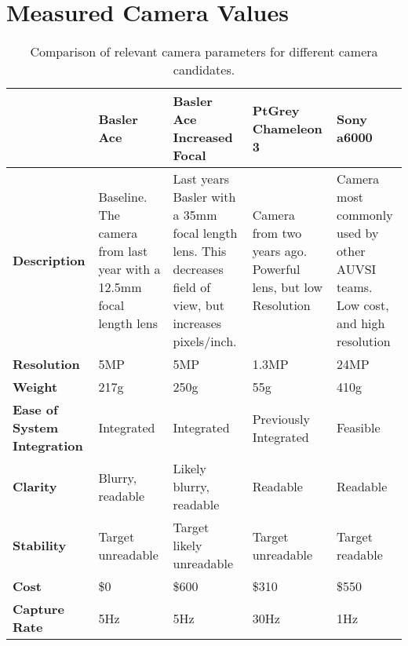 \documentclass[]{auvsi_doc}
\begin{document}
\section{Measured Camera Values}
\begin{table}[H]
	\centering
	\caption{Comparison of relevant camera parameters for different camera candidates.}
	\begin{tabular}{|p{2.5cm}|p{2.9cm}|p{2.9cm}|p{2.9cm}|p{2.9cm}|}
	\hline
	\rowcolor[HTML]{C0C0C0}
& {\color[HTML]{000000} \textbf{Basler Ace}} & {\color[HTML]{000000} \textbf{Basler Ace Increased Focal}} & {\color[HTML]{000000} \textbf{PtGrey Chameleon 3}} & {\color[HTML]{000000} \textbf{Sony a6000}}\\ \hline
{\color[HTML]{000000} \textbf{Description}}	&	Baseline. The camera from last year with a 12.5mm focal length lens	&	Last years Basler with a 35mm focal length lens. This decreases field of view, but increases pixels/inch. &	Camera from two years ago. Powerful lens, but low Resolution	&	Camera most commonly used by other AUVSI teams. Low cost, and high resolution\\ \hline
{\color[HTML]{000000} \textbf{Resolution}}	&	5MP	&	5MP	&	1.3MP	&	24MP\\ \hline
{\color[HTML]{000000} \textbf{Weight}}	&	217g	&	250g	&	55g	&	410g\\ \hline
{\color[HTML]{000000} \textbf{Ease of System Integration}}	&	Integrated	&	Integrated	&	Previously Integrated	&	Feasible\\ \hline
{\color[HTML]{000000} \textbf{Clarity}}	&	Blurry, readable	&	Likely blurry, readable	&	Readable 	& Readable\\ \hline
{\color[HTML]{000000} \textbf{Stability}}	& Target unreadable	&	Target likely unreadable	&	Target unreadable	&	Target readable\\ \hline
{\color[HTML]{000000} \textbf{Cost}}	&	\$0 	&	\$600 	&	\$310	&	\$550\\ \hline
{\color[HTML]{000000} \textbf{Capture Rate}}	&	5Hz	&	5Hz	&	30Hz	&	1Hz\\ \hline
	\end{tabular}
\end{table}
\end{document}
